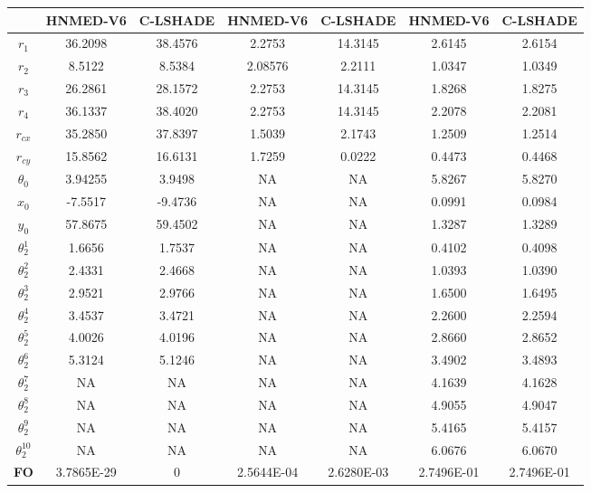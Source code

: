 \begin{table}[p]
{\begin{tabular}{|c|c|c|c|c|c|c|}
	         & \textbf{HNMED-V6}&\textbf{C-LSHADE}&\textbf{HNMED-V6}&\textbf{C-LSHADE}&\textbf{HNMED-V6}&\textbf{C-LSHADE}  \\
		\hline                         
		$r_1$                         & 36.2098&38.4576   & 2.2753& 14.3145   & 2.6145& 2.6154   \\
		\hline
		$r_2$                          & 8.5122& 8.5384  & 2.08576&2.2111& 1.0347&  1.0349    \\
		\hline
		$r_3$                         & 26.2861& 28.1572   & 2.2753&14.3145    & 1.8268&  1.8275    \\
		\hline
		$r_4$                         & 36.1337&38.4020    & 2.2753&14.3145  & 2.2078 &  2.2081   \\
		\hline
		$r_{cx}$                        & 35.2850&37.8397    & 1.5039&2.1743   & 1.2509&  1.2514    \\
		\hline
		$r_{cy}$                      & 15.8562& 16.6131    & 1.7259& 0.0222  & 0.4473 &  0.4468   \\
		\hline
		$\theta_0$                      & 3.94255&3.9498    & NA&   NA      & 5.8267& 5.8270     \\
		\hline
		$x_0$                         & -7.5517&-9.4736    & NA&    NA     & 0.0991&  0.0984    \\
		\hline
		$y_0$                         & 57.8675&59.4502    & NA &     NA   & 1.3287 & 1.3289    \\
		\hline
		$\theta^1_2$                     & 1.6656&1.7537     & NA&      NA   & 0.4102 &  0.4098   \\
		\hline
		$\theta^2_2$                     & 2.4331&2.4668     & NA&        NA & 1.0393 & 1.0390    \\
		\hline
		$\theta^3_2$                     & 2.9521&2.9766     & NA&NA         & 1.6500 &  1.6495   \\
		\hline
		$\theta^4_2$                     & 3.4537&3.4721     & NA & NA       & 2.2600 & 2.2594    \\
		\hline
		$\theta^5_2$                     & 4.0026&4.0196    & NA & NA       & 2.8660  &  2.8652  \\
		\hline
		$\theta^6_2$                     & 5.3124&5.1246     & NA &NA        & 3.4902 &  3.4893   \\
		\hline
		$\theta^7_2$                     & NA    &  NA   & NA & NA       & 4.1639 & 4.1628    \\
		\hline
		$\theta^8_2$                     & NA    &  NA   & NA & NA       & 4.9055 &  4.9047   \\
		\hline
		$\theta^9_2$                     & NA    &   NA  & NA & NA       & 5.4165 & 5.4157    \\
		\hline
		$\theta^{10}_2$                     & NA &     NA   & NA &NA        & 6.0676 & 6.0670    \\
		\hline
		\textbf{FO}                    & 3.7865E-29 &0&2.5644E-04&2.6280E-03& 2.7496E-01& 2.7496E-01\\
		\hline
	\end{tabular}
}
\end{table}

